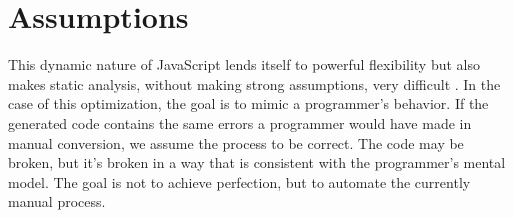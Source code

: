 \section{Assumptions}

This dynamic nature of JavaScript lends itself to powerful flexibility but also makes static analysis, without making strong assumptions, very difficult \cite{staticanalysis12}.  In the case of this optimization, the goal is to mimic a programmer's behavior.  If the generated code contains the same errors a programmer would have made in manual conversion, we assume the process to be correct.  The code may be broken, but it's broken in a way that is consistent with the programmer's mental model.  The goal is not to achieve perfection, but to automate the currently manual process.  




